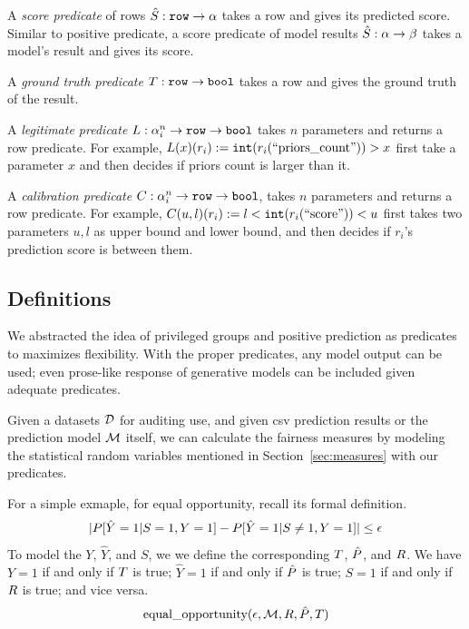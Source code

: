 \documentclass[conference]{IEEEtran}
\begin{document}
A \emph{score predicate} of rows $\hat{S} : \mathtt{row} \rightarrow \alpha$ takes a row and gives its predicted score. Similar to positive predicate, a score predicate of model results $\hat{S} : \alpha \rightarrow \beta$ takes a model's result and gives its score.

A \emph{ground truth predicate} $T : \mathtt{row} \rightarrow \mathtt{bool}$ takes a row and gives the ground truth of the result.

A \emph{legitimate predicate} $L : \alpha_i^n \rightarrow \mathtt{row} \rightarrow \mathtt{bool}$ takes $n$ parameters and returns a row predicate. For example, $L(x)(r_i) := \mathtt{int}(r_i(\text{``priors\_count''})) > x$ first take a parameter $x$ and then decides if priors count is larger than it.

A \emph{calibration predicate} $C : \alpha_i^n \rightarrow \mathtt{row} \rightarrow \mathtt{bool}$, takes $n$ parameters and returns a row predicate. For example, $C(u, l)(r_i) := l < \mathtt{int}(r_i(\text{``score''})) < u$ first takes two parameters $u,l$ as upper bound and lower bound, and then decides if $r_i$'s prediction score is between them.

\subsection{Definitions}
We abstracted the idea of privileged groups and positive prediction as predicates to maximizes flexibility. With the proper predicates, any model output can be used; even prose-like response of generative models can be included given adequate predicates.

Given a datasets $\mathcal{D}$ for auditing use, and given csv prediction results or the prediction model $\mathcal{M}$ itself, we can calculate the fairness measures by modeling the statistical random variables mentioned in Section~\ref{sec:measures} with our predicates.

For a simple exmaple, for equal opportunity, recall its formal definition.
\begin{align*}
    \lvert P[\hat{Y} = 1 | S = 1, Y = 1] - P[\hat{Y} = 1 | S \neq 1, Y = 1]\rvert \leq \epsilon
\end{align*}
To model the $Y$, $\hat{Y}$, and $S$, we we define the corresponding $T$, $\hat{P}$, and $R$. We have $Y = 1$ if and only if $T$ is true; $\hat{Y} = 1$ if and only if $\hat{P}$ is true; $S = 1$ if and only if $R$ is true; and vice versa.
\begin{align*}
    \text{equal\_opportunity} (\epsilon, \mathcal{M}, R, \hat{P}, T)
\end{align*}
\end{document}
